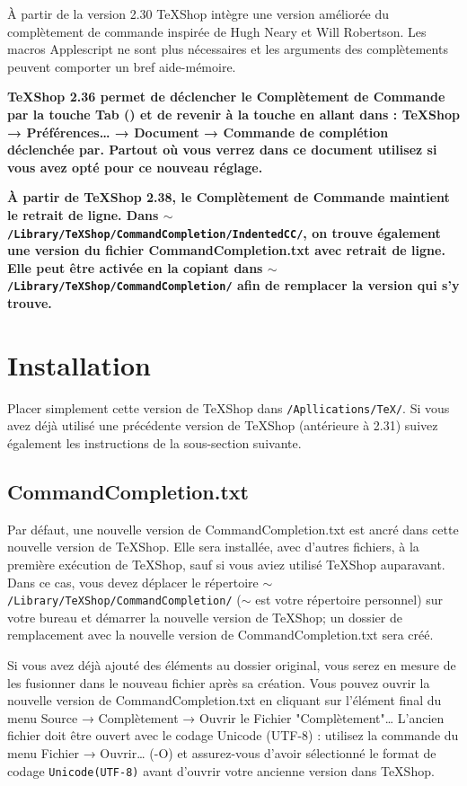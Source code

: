 \documentclass[12pt,french]{article}
\newcommand{\tab}{{\raisebox{-2pt}{\WDL\symbol{42}}}}
\newcommand{\esc}{{\WD \symbol{82}}}
\newcommand{\cmd}{{\WA \symbol{122}}}
\newcommand{\texs}{\textsf{\TeX{}Shop}}
\begin{document}
À partir de la version 2.30 \texs{} intègre une version améliorée du complètement de commande inspirée 
de Hugh Neary et Will Robertson. Les macros Applescript ne sont plus nécessaires et les arguments des 
complètements peuvent comporter un bref aide-mémoire.

\textbf{\texs{} 2.36 permet de déclencher le Complètement de Commande par la touche Tab (\tab{}) et de revenir à la touche \esc{} en allant dans : \texs{} → \textsf{Préférences…} → \textsf{Document} → \textsf{Commande de complétion déclenchée par}. Partout où vous verrez dans ce document \esc{} utilisez \tab{} si vous avez opté pour ce nouveau réglage.}

\textbf{À partir de \texs{} 2.38, le Complètement de Commande maintient le retrait de ligne. Dans \texttt{$\sim$\!/Library/TeXShop/CommandCompletion/IndentedCC/}, on trouve également une version du fichier \textsf{CommandCompletion.txt} avec retrait de ligne. Elle peut être activée en la copiant dans \texttt{$\sim$\!/Library/TeXShop/CommandCompletion/} afin de remplacer la version qui s'y trouve.}

\section*{Installation}

Placer simplement cette version de \texs{} dans \texttt{/Apllications/TeX/}. Si vous avez déjà utilisé une précédente 
version de \texs{} (antérieure à 2.31) suivez également les instructions de la sous-section suivante.

\subsection*{\textsf{CommandCompletion.txt}}

Par défaut, une nouvelle version de \textsf{CommandCompletion.txt} est ancré dans cette nouvelle version de \texs. 
Elle sera installée, avec d'autres fichiers, à la première exécution de \texs{}, sauf si vous aviez utilisé \texs{} 
auparavant. Dans ce cas, vous devez déplacer le répertoire \texttt{$\sim$/Library/TeXShop/CommandCompletion/} 
(\texttt{$\sim$} est votre répertoire personnel) sur votre bureau et démarrer la nouvelle version de \texs{}; un dossier 
de remplacement avec la nouvelle version de \textsf{CommandCompletion.txt} sera créé.

Si vous avez déjà ajouté des éléments au dossier original, vous serez en mesure de les fusionner dans le nouveau 
fichier après sa création. Vous pouvez ouvrir la nouvelle version de \textsf{CommandCompletion.txt} en cliquant sur 
l'élément final du menu \textsf{Source} → \textsf{Complètement} → \textsf{Ouvrir le Fichier "Complètement"…} 
L'ancien fichier doit être ouvert avec le codage Unicode (UTF-8) : utilisez la commande du menu \textsf{Fichier} → 
\textsf{Ouvrir…} (\cmd{}-O) et assurez-vous d'avoir sélectionné le format de codage \texttt{Unicode(UTF-8)} avant 
d'ouvrir votre ancienne version dans \texs.
\end{document}
